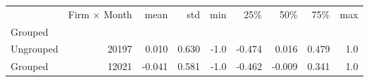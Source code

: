 \begin{tabular}{lrrrrrrrr}
\toprule
{} &  Firm $\times$ Month &   mean &    std &  min &    25\% &    50\% &    75\% &  max \\
Grouped   &                       &        &        &      &        &        &        &      \\
\midrule
Ungrouped &                 20197 &  0.010 &  0.630 & -1.0 & -0.474 &  0.016 &  0.479 &  1.0 \\
Grouped   &                 12021 & -0.041 &  0.581 & -1.0 & -0.462 & -0.009 &  0.341 &  1.0 \\
\bottomrule
\end{tabular}
